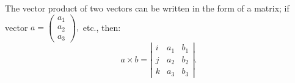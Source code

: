 The vector product of two vectors can be written in the 
form of a matrix;  if
vector 
$ a = \left ( 
\begin{array}{c} 
  a_1 \\
  a_2 \\
  a_3 
\end{array} 
\right ) , $
etc., then: 
\[ a \times b = \left | 
\begin{array}{ccc}  
  i & a_1 & b_1 \\
  j & a_2 & b_2 \\
  k & a_3 & b_3 
\end{array} 
\right | . \]